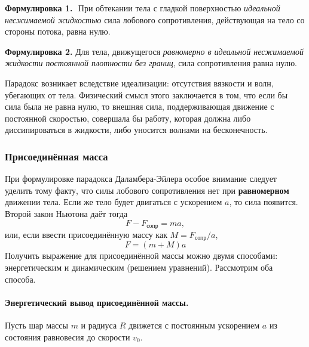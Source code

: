 \textbf{Формулировка 1.\,\, }{При обтекании тела с гладкой поверхностью \textit{идеальной несжимаемой
    жидкостью} сила лобового сопротивления, действующая на тело со
стороны потока, равна нулю.}


\textbf{Формулировка 2. }{Для тела, движущегося \textit{равномерно в идеальной несжимаемой
    жидкости постоянной плотности без границ}, сила сопротивления
равна нулю.}

\vspace{0.5em}
Парадокс возникает вследствие идеализации: отсутствия вязкости и волн, убегающих от тела. Физический смысл этого заключается в том, что если бы сила была не равна нулю, то внешняя сила, поддерживающая
движение с постоянной скоростью, совершала бы работу, которая должна либо
диссипироваться в жидкости, либо уносится волнами на бесконечность.


\subsubsection{Присоединённая масса}

При формулировке парадокса Даламбера-Эйлера особое внимание следует уделить тому факту, что силы лобового сопротивления нет при \textbf{равномерном} движении тела. Если же тело будет двигаться с ускорением $a$, то сила появится. Второй закон Ньютона даёт тогда
\begin{equation}
	F-F_\text{сопр} = ma,
\end{equation}
или, если ввести присоединённую массу как $M = F_\text{сопр}/a$,
\begin{equation}
	F = (m+M)a
\end{equation}
Получить выражение для присоединённой массы можно двумя способами: энергетическим и динамическим (решением уравнений). Рассмотрим оба способа.

\paragraph{Энергетический вывод присоединённой массы. } Пусть шар массы 
$m$ и радиуса $R$ движется с постоянным ускорением $a$ из состояния 
равновесия до скорости $v_0$.

